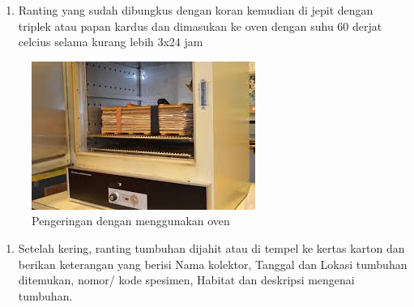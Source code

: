 \documentclass[
  oneside]{book}
\providecommand{\tightlist}{%
  \setlength{\itemsep}{0pt}\setlength{\parskip}{0pt}}
\begin{document}
\begin{enumerate}
\def\labelenumi{\arabic{enumi}.}
\setcounter{enumi}{4}
\tightlist
\item
  Ranting yang sudah dibungkus dengan koran kemudian di jepit dengan triplek atau papan kardus dan dimasukan ke oven dengan suhu 60 derjat celcius selama kurang lebih 3x24 jam
\end{enumerate}

\begin{figure}

{\centering \includegraphics[width=1\linewidth]{images/oven} 

}

\caption{Pengeringan dengan menggunakan oven}\label{fig:oven}
\end{figure}

\begin{enumerate}
\def\labelenumi{\arabic{enumi}.}
\setcounter{enumi}{5}
\tightlist
\item
  Setelah kering, ranting tumbuhan dijahit atau di tempel ke kertas karton dan berikan keterangan yang berisi Nama kolektor, Tanggal dan Lokasi tumbuhan ditemukan, nomor/ kode spesimen, Habitat dan deskripsi mengenai tumbuhan.
\end{enumerate}
\end{document}
